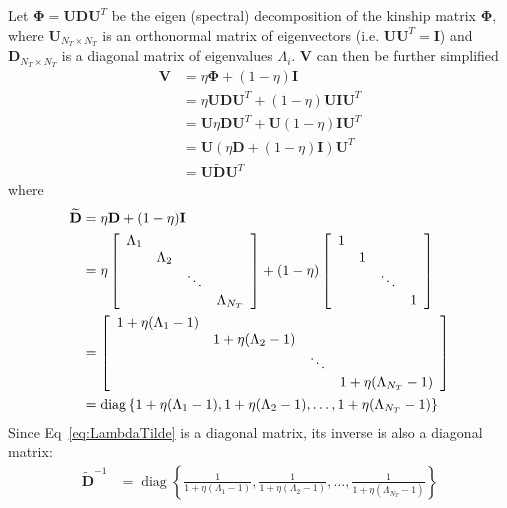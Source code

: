 \documentclass[10pt,letterpaper]{article}
\newcommand{\bD}{\textbf{D}}
\newcommand{\bU}{\textbf{U}}
\newcommand{\bV}{\textbf{V}}
\newcommand{\bI}{\textbf{I}}
\newcommand{\bPhi}{\boldsymbol{\Phi}}
\DeclareMathOperator{\diag}{diag} %
\begin{document}
Let $\bPhi = \bU \bD \bU^T$ be the eigen (spectral) decomposition of the kinship matrix $\bPhi$, where $\bU_{N_T \times N_T}$ is an orthonormal matrix of eigenvectors (i.e. $\bU \bU^T = \bI$) and $\bD_{N_T \times N_T}$ is a diagonal matrix of eigenvalues $\Lambda_i$. $\bV$ can then be further simplified~\cite{pirinen2013efficient}
\begin{align}
\bV & = \eta \bPhi + (1-\eta) \bI \nonumber \\
& = \eta \bU \bD \bU^T + (1-\eta) \bU \bI \bU^T \nonumber \\
& = \bU \eta  \bD \bU^T + \bU (1-\eta) \bI \bU^T \nonumber \\
& = \bU \left(\eta  \bD + (1-\eta) \bI\right) \bU^T \nonumber \\
& = \bU \widetilde{\bD} \bU^T  \label{eq:Vsimplified}
\end{align}
where
\begin{align}
\widetilde{\bD} & = \eta  \bD + (1-\eta) \bI  \label{eq:LambdaTilde} \\
& =  \eta \left[ \begin{array}{cccc}
\Lambda_1 & \hfill & \hfill & \hfill  \\
\hfill & \Lambda_2 & \hfill & \hfill  \\
\hfill & \hfill & \ddots &\hfill  \\
\hfill & \hfill & \hfill & \Lambda_{N_T}  \\
\end{array} \right] + (1-\eta) \left[ \begin{array}{cccc}
1 & \hfill & \hfill & \hfill  \\
\hfill & 1 & \hfill & \hfill  \\
\hfill & \hfill & \ddots &\hfill  \\
\hfill & \hfill & \hfill & 1  \\
\end{array} \right]  \nonumber \\
& =   \left[ \begin{array}{cccc}
1 + \eta (\Lambda_1-1) & \hfill & \hfill & \hfill  \\
\hfill & 1 + \eta (\Lambda_2-1) & \hfill & \hfill  \\
\hfill & \hfill & \ddots &\hfill  \\
\hfill & \hfill & \hfill & 1 + \eta (\Lambda_{N_T}-1)  \\
\end{array} \right]   \nonumber \\
& = \diag\left\lbrace 1 + \eta (\Lambda_1-1), 1 + \eta (\Lambda_2-1), \ldots, 1 + \eta (\Lambda_{N_T}-1) \label{eq:DiagLambda} \right\rbrace
\end{align}
Since Eq~\ref{eq:LambdaTilde} is a diagonal matrix, its inverse is also a diagonal matrix:
\begin{align}
\widetilde{\bD}^{-1} & = \diag\left\lbrace \frac{1}{1 + \eta (\Lambda_1-1)}, \frac{1}{1 + \eta (\Lambda_2-1)}, \ldots, \frac{1}{1 + \eta (\Lambda_{N_T}-1)} \label{eq:DiagInvLambda} \right\rbrace
\end{align}
\end{document}
